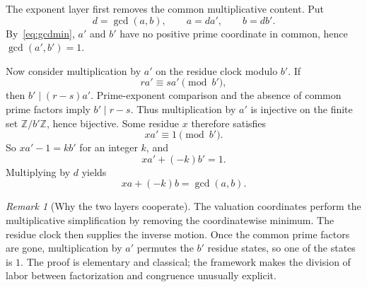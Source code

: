 \documentclass[11pt,a4paper]{article}
\theoremstyle{clockplain}
\theoremstyle{definition}
\theoremstyle{remark}
\newtheorem{remark}[proposition]{Remark}
\newcommand{\Z}{\mathbb Z}
\begin{document}
The exponent layer first removes the common multiplicative content. Put
\[
d=\gcd(a,b),\qquad a=da',\qquad b=db'.
\]
By~\eqref{eq:gcdmin}, $a'$ and $b'$ have no positive prime coordinate in common, hence $\gcd(a',b')=1$.

Now consider multiplication by $a'$ on the residue clock modulo $b'$. If
\[
ra'\equiv sa'\pmod{b'},
\]
then $b'\mid(r-s)a'$. Prime-exponent comparison and the absence of common prime factors imply $b'\mid r-s$. Thus multiplication by $a'$ is injective on the finite set $\Z/b'\Z$, hence bijective. Some residue $x$ therefore satisfies
\[
xa'\equiv1\pmod{b'}.
\]
So $xa'-1=kb'$ for an integer $k$, and
\begin{equation}
xa'+(-k)b'=1.
\end{equation}
Multiplying by $d$ yields
\begin{equation}
\boxed{xa+(-k)b=\gcd(a,b).}
\label{eq:bezout}
\end{equation}

\begin{remark}[Why the two layers cooperate]
The valuation coordinates perform the multiplicative simplification by removing the coordinatewise minimum. The residue clock then supplies the inverse motion. Once the common prime factors are gone, multiplication by $a'$ permutes the $b'$ residue states, so one of the states is $1$. The proof is elementary and classical; the framework makes the division of labor between factorization and congruence unusually explicit.
\end{remark}
\end{document}
